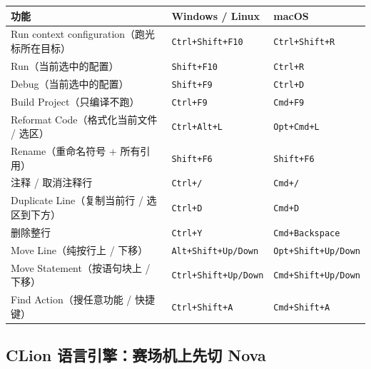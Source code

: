 \begin{center}
	\begin{tabular}{l|l|l}
		\hline
		功能                               & Windows / Linux             & macOS                      \\
		\hline
		Run context configuration（跑光标所在目标） & \texttt{Ctrl+Shift+F10}     & \texttt{Ctrl+Shift+R}      \\
		\hline
		Run（当前选中的配置）                       & \texttt{Shift+F10}          & \texttt{Ctrl+R}            \\
		\hline
		Debug（当前选中的配置）                     & \texttt{Shift+F9}           & \texttt{Ctrl+D}            \\
		\hline
		Build Project（只编译不跑）               & \texttt{Ctrl+F9}            & \texttt{Cmd+F9}            \\
		\hline
		Reformat Code（格式化当前文件 / 选区）        & \texttt{Ctrl+Alt+L}         & \texttt{Opt+Cmd+L}         \\
		\hline
		\rowcolor{yellow!30}
		Rename（重命名符号 + 所有引用）               & \texttt{Shift+F6}           & \texttt{Shift+F6}          \\
		\hline
		注释 / 取消注释行                         & \texttt{Ctrl+/}             & \texttt{Cmd+/}             \\
		\hline
		\rowcolor{yellow!30}
		Duplicate Line（复制当前行 / 选区到下方）      & \texttt{Ctrl+D}             & \texttt{Cmd+D}             \\
		\hline
		\rowcolor{yellow!30}
		删除整行                               & \texttt{Ctrl+Y}             & \texttt{Cmd+Backspace}     \\
		\hline
		\rowcolor{yellow!30}
		Move Line（纯按行上 / 下移）               & \texttt{Alt+Shift+Up/Down}  & \texttt{Opt+Shift+Up/Down} \\
		\hline
		Move Statement（按语句块上 / 下移）         & \texttt{Ctrl+Shift+Up/Down} & \texttt{Cmd+Shift+Up/Down} \\
		\hline
		Find Action（搜任意功能 / 快捷键）           & \texttt{Ctrl+Shift+A}       & \texttt{Cmd+Shift+A}       \\
		\hline
	\end{tabular}
\end{center}

\subsection{CLion 语言引擎：赛场机上先切 Nova}

